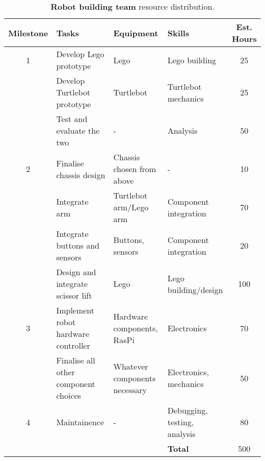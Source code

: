 \documentclass{article}
\begin{document}
\begin{table*}[]
  \begin{center}
  \begin{small}
  \begin{tabular}{|c|l|l|l|c|}
    \hline
    {\bf Milestone} & {\bf Tasks} & {\bf Equipment} & {\bf Skills} & {\bf Est. Hours} \\ \hline
    1               & Develop Lego prototype & Lego & Lego building & 25\\ \cline{2-5}
                    & Develop Turtlebot prototype & Turtlebot & Turtlebot mechanics & 25\\ \cline{2-5}
                    & Test and evaluate the two & - & Analysis & 50\\ \hline
    2               & Finalise chassis design & Chassis chosen from above & - & 10\\ \cline{2-5}
                    & Integrate arm & Turtlebot arm/Lego arm & Component integration & 70\\ \cline{2-5}
                    & Integrate buttons and sensors & Buttons, sensors & Component integration & 20\\ \cline{2-5}
                    & Design and integrate scissor lift & Lego & Lego building/design & 100\\ \hline
    3               & Implement robot hardware controller & Hardware components, RasPi & Electronics & 70\\ \cline{2-5}
                    & Finalise all other component choices & Whatever components necessary & Electronics, mechanics & 50\\ \hline
    4               & Maintainence & - & Debugging, testing, analysis & 80\\ \hline
                    &                           &  & {\bf Total} & 500 \\ \hline
  \end{tabular}
  \end{small}
  \caption{{\bf Robot building team} resource distribution.}
  \label{tab:rb-rd}
  \end{center}
\end{table*}
\end{document}
